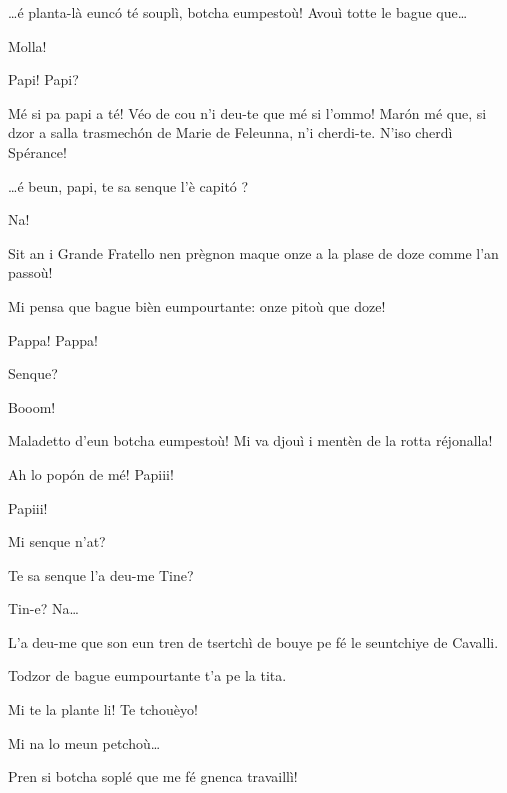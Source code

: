 \begin{drama}
\Tanteunspeaks \ldots é planta-là eunc\'o té souplì, botcha eumpestoù! Avouì totte le bague que\ldots


\Tanteunspeaks{} Molla!

\Alicespeaks Papi! Papi?

\Tanteunspeaks{} Mé si pa papi a té! Véo de cou n'i deu-te que mé si l’ommo! Mar\'on mé que, si dzor a salla trasmech\'on de Marie de Feleunna, n’i cherdi-te. N’iso cherdì Spérance!

\Alicespeaks{} \ldots é beun, papi, te sa senque l'è capit\'o ? 

\Tanteunspeaks Na!

\Alicespeaks Sit an i Grande Fratello nen prègnon maque onze a la plase de doze comme l’an passoù!

\Tanteunspeaks{} Mi pensa que bague bièn eumpourtante: onze pitoù que doze!

\Twitterspeaks Pappa! Pappa!

\Tanteunspeaks Senque?


\Twitterspeaks Booom!

\Tanteunspeaks{} Maladetto d'eun botcha eumpestoù! Mi va djouì i mentèn de la rotta réjonalla!

\Alicespeaks{} Ah lo pop\'on de mé! Papiii!


\Alicespeaks Papiii!

\Tanteunspeaks Mi senque n'at?

\Alicespeaks Te sa senque l'a deu-me Tine?

\Tanteunspeaks Tin-e? Na\ldots

\Alicespeaks L'a deu-me que son eun tren de tsertchì de bouye pe fé le seuntchiye de Cavalli. 

\Tanteunspeaks{} Todzor de bague eumpourtante t'a pe la tita.


\Tanteunspeaks Mi te la plante li! Te tchouèyo!

\Alicespeaks Mi na lo meun petchoù\ldots

\Tanteunspeaks{} Pren si botcha soplé que me fé gnenca travaillì!


\end{drama}

